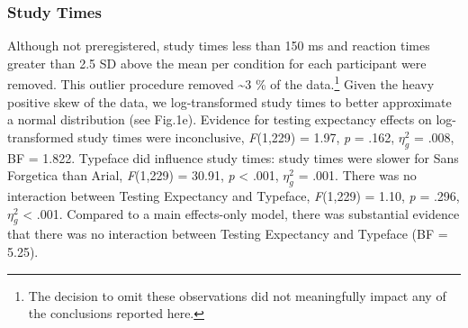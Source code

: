 \documentclass[
  english,
  jou]{apa7}
\begin{document}
\hypertarget{study-times}{%
\subsubsection{Study Times}\label{study-times}}

Although not preregistered, study times less than 150 ms and reaction times greater than 2.5 SD above the mean per condition for each participant were removed. This outlier procedure removed \textasciitilde3 \% of the data.\footnote{The decision to omit these observations did not meaningfully impact any of the conclusions reported here.} Given the heavy positive skew of the data, we log-transformed study times to better approximate a normal distribution (see Fig.1e). Evidence for testing expectancy effects on log-transformed study times were inconclusive, \emph{F}(1,229) = 1.97, \emph{p} = .162, \(\eta_{g}^{2}\) = .008, BF = 1.822. Typeface did influence study times: study times were slower for Sans Forgetica than Arial, \emph{F}(1,229) = 30.91, \emph{p} \textless{} .001, \(\eta_{g}^{2}\) = .001. There was no interaction between Testing Expectancy and Typeface, \emph{F}(1,229) = 1.10, \emph{p} = .296, \(\eta_{g}^{2}\) \textless{} .001. Compared to a main effects-only model, there was substantial evidence that there was no interaction between Testing Expectancy and Typeface (BF = 5.25).
\end{document}
